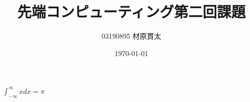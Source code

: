 \documentclass[a4paper,11pt]{jsarticle}
\begin{document}
\title{先端コンピューティング第二回課題}
\author{03190895 材原貫太}
\date{\today}
\maketitle

\begin{math}
  \int^{\infty}_{-\infty}x dx = \pi
\end{math}
\end{document}
